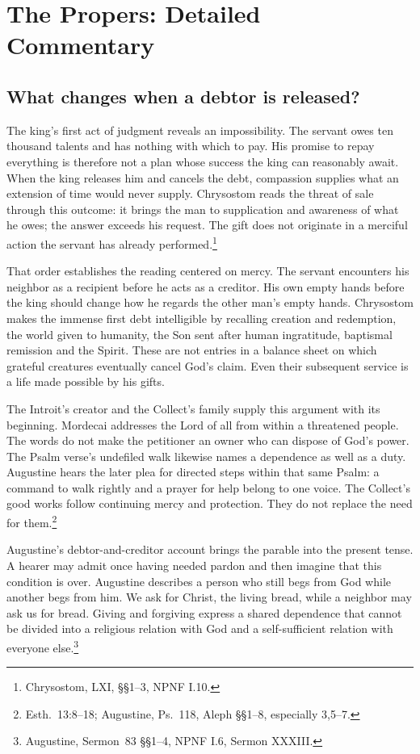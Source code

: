 \section{The Propers: Detailed Commentary}

\subsection{What changes when a debtor is released?}
The king's first act of judgment reveals an impossibility. The servant owes ten thousand talents and has nothing with which to pay. His promise to repay everything is therefore not a plan whose success the king can reasonably await. When the king releases him and cancels the debt, compassion supplies what an extension of time would never supply. Chrysostom reads the threat of sale through this outcome: it brings the man to supplication and awareness of what he owes; the answer exceeds his request. The gift does not originate in a merciful action the servant has already performed.\footnote{Chrysostom,  LXI, \S\S1--3, NPNF I.10.}

That order establishes the reading centered on mercy. The servant encounters his neighbor as a recipient before he acts as a creditor. His own empty hands before the king should change how he regards the other man's empty hands. Chrysostom makes the immense first debt intelligible by recalling creation and redemption, the world given to humanity, the Son sent after human ingratitude, baptismal remission and the Spirit. These are not entries in a balance sheet on which grateful creatures eventually cancel God's claim. Even their subsequent service is a life made possible by his gifts.

The Introit's creator and the Collect's family supply this argument with its beginning. Mordecai addresses the Lord of all from within a threatened people. The words do not make the petitioner an owner who can dispose of God's power. The Psalm verse's undefiled walk likewise names a dependence as well as a duty. Augustine hears the later plea for directed steps within that same Psalm: a command to walk rightly and a prayer for help belong to one voice. The Collect's good works follow continuing mercy and protection. They do not replace the need for them.\footnote{Esth.~13:8--18; Augustine, Ps.~118, Aleph \S\S1--8, especially 3,5--7.}

Augustine's debtor-and-creditor account brings the parable into the present tense. A hearer may admit once having needed pardon and then imagine that this condition is over. Augustine describes a person who still begs from God while another begs from him. We ask for Christ, the living bread, while a neighbor may ask us for bread. Giving and forgiving express a shared dependence that cannot be divided into a religious relation with God and a self-sufficient relation with everyone else.\footnote{Augustine, Sermon~83 \S\S1--4, NPNF I.6, Sermon XXXIII.}

